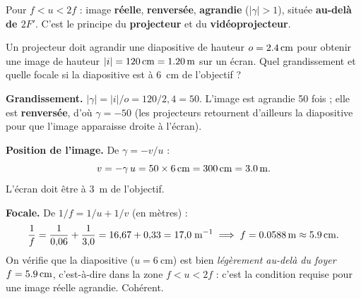 \documentclass[11pt,a4paper]{article}
\newcommand{\LentilleConv}[2]{%
  \draw[verrecol,line width=1.8pt,<->,>=Stealth] (#1,-#2)--(#1,#2);}
\newcommand{\gamm}{\gamma}             %
\begin{document}
\begin{center}
\end{center}

\begin{theoreme}
Pour $f<u<2f$ : image \textbf{réelle}, \textbf{renversée}, \textbf{agrandie} ($|\gamm|>1$), située
\textbf{au-delà de $2F'$}. C'est le principe du \textbf{projecteur} et du \textbf{vidéoprojecteur}.
\end{theoreme}

\begin{exemple}
Un projecteur doit agrandir une diapositive de hauteur $o=\SI{2{,}4}{\centi\metre}$ pour obtenir une
image de hauteur $|i|=\SI{120}{\centi\metre}=\SI{1{,}20}{\metre}$ sur un écran. Quel grandissement et
quelle focale si la diapositive est à \SI{6}{\centi\metre} de l'objectif ?

\smallskip
\textbf{Grandissement.} $|\gamm|=|i|/o=120/2{,}4=50$. L'image est agrandie \SI{50}{} fois ; elle est
\textbf{renversée}, d'où $\gamm=-50$ (les projecteurs retournent d'ailleurs la diapositive pour que
l'image apparaisse droite à l'écran).

\smallskip
\textbf{Position de l'image.} De $\gamm=-v/u$ :
\[ v=-\gamm\,u=50\times\SI{6}{\centi\metre}=\SI{300}{\centi\metre}=\SI{3{,}0}{\metre}. \]
L'écran doit être à \SI{3}{\metre} de l'objectif.

\smallskip
\textbf{Focale.} De $1/f=1/u+1/v$ (en mètres) :
\[ \frac{1}{f}=\frac{1}{0{,}06}+\frac{1}{3{,}0}=16{,}67+0{,}33=17{,}0\;\si{\per\metre}
   \;\Longrightarrow\; f=\SI{0{,}0588}{\metre}\approx\SI{5{,}9}{\centi\metre}. \]
On vérifie que la diapositive ($u=\SI{6}{\centi\metre}$) est bien \emph{légèrement au-delà du foyer}
$f=\SI{5{,}9}{\centi\metre}$, c'est-à-dire dans la zone $f<u<2f$ : c'est la condition requise pour une
image réelle agrandie. Cohérent.
\end{exemple}
\end{document}
